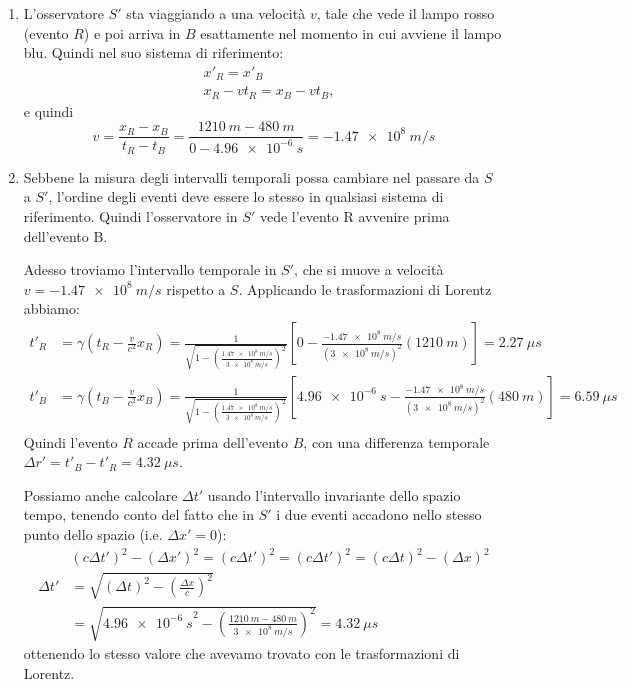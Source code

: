 \begin{Answer}
  \begin{enumerate}
    \item L'osservatore $S'$ sta viaggiando a una velocit\`a $v$, tale che vede il lampo rosso (evento $R$) e
      poi arriva in $B$ esattamente nel momento in cui avviene il lampo blu. Quindi nel suo sistema di riferimento:
      \begin{align*}
        &x'_R = x'_B \\
        &x_R - vt_R = x_B - vt_B,
      \end{align*}
      e quindi
      \begin{equation*}
        v = \frac{x_R - x_B}{t_R-t_B} =
        \frac{\SI{1210}{m} - \SI{480}{m}}{0-\SI{4.96e-6}{s}} =
        \SI{-1.47e8}{m/s}
      \end{equation*}

    \item Sebbene la misura degli intervalli temporali possa cambiare
      nel passare da $S$ a $S'$, l'ordine degli eventi deve essere lo
      stesso in qualsiasi sistema di riferimento. Quindi l'osservatore in $S'$ vede l'evento R avvenire prima dell'evento B.

      Adesso troviamo l'intervallo temporale in $S'$, che si muove a
      velocit\`a $v=\SI{-1.47e8}{m/s}$ rispetto a $S$. Applicando le
      trasformazioni di Lorentz abbiamo:
      \begin{align*}
        t'_R &= \gamma\left(t_R-\frac{v}{c^2}x_R\right) = \frac{1}{\sqrt{1-\left(\frac{\SI{1.47e8}{m/s}}{\SI{3e8}{m/s}}\right)^2}}
        \left[0-\frac{\SI{-1.47e8}{m/s}}{(\SI{3e8}{m/s})^2}(\SI{1210}{m})\right]=\SI{2.27}{\mu s} \\
        t'_B &= \gamma\left(t_B-\frac{v}{c^2}x_B\right) = \frac{1}{\sqrt{1-\left(\frac{\SI{1.47e8}{m/s}}{\SI{3e8}{m/s}}\right)^2}}
        \left[\SI{4.96e-6}{s}-\frac{\SI{-1.47e8}{m/s}}{(\SI{3e8}{m/s})^2}(\SI{480}{m})\right]=\SI{6.59}{\mu s} \\
      \end{align*}
      Quindi l'evento $R$ accade prima dell'evento $B$, con una
      differenza temporale $\Delta r'= t'_B-t'_R=\SI{4.32}{\mu s}$.

      Possiamo anche calcolare $\Delta t'$ usando l'intervallo
      invariante dello spazio tempo, tenendo conto del fatto che in
      $S'$ i due eventi accadono nello stesso punto dello spazio
      (i.e. $\Delta x'=0$):
      \begin{align*}
        &(c\Delta t')^2-(\Delta x')^2 = (c\Delta t')^2 = (c\Delta t')^2 = (c\Delta t)^2-(\Delta x)^2 \\
        \Delta t' &= \sqrt{(\Delta t)^2-\left(\frac{\Delta x}{c}\right)^2} \\
        & = \sqrt{ \SI{4.96e-6}{s}^2 - \left( \frac{\SI{1210}{m}-\SI{480}{m}}{\SI{3e8}{m/s}} \right)^2} = \SI{4.32}{\mu s}
      \end{align*}
      ottenendo lo stesso valore che avevamo trovato con le trasformazioni di Lorentz.
  \end{enumerate}
\end{Answer}

